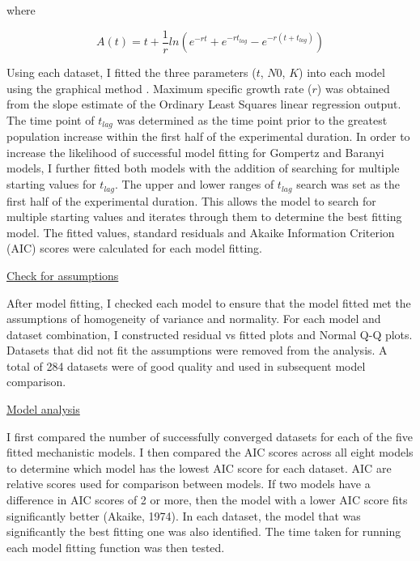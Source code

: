 \documentclass[11pt]{article}
\begin{document}
\begin{center} where \end{center} \begin{equation}  A(t) = t + \frac{1}{r}ln(e^{-rt}+e^{-rt_{lag}}- e^{-r(t+t_{lag})}) \end{equation}



Using each dataset, I fitted the three parameters (\(t\), \(N0\), \(K\)) into each model using the graphical method \cite{holmstrom_review_2002}. Maximum specific growth rate (\(r\)) was obtained from the slope estimate of the Ordinary Least Squares linear regression output. The time point of \(t_{lag}\) was determined as the time point prior to the greatest population increase within the first half of the experimental duration. In order to increase the likelihood of successful model fitting for Gompertz and Baranyi models, I further fitted both models with the addition of searching for multiple starting values for \(t_{lag}\). The upper and lower ranges of \(t_{lag}\) search was set as the first half of the experimental duration. This allows the model to search for multiple starting values and iterates through them to determine the best fitting model. The fitted values, standard residuals and Akaike Information Criterion (AIC) scores were calculated for each model fitting.
\vspace{\baselineskip}

\underline{Check for assumptions} 

After model fitting, I checked each model to ensure that the model fitted met the assumptions of homogeneity of variance and normality. For each model and dataset combination, I constructed residual vs fitted plots and Normal Q-Q plots. Datasets that did not fit the assumptions were removed from the analysis. A total of 284 datasets were of good quality and used in subsequent model comparison.
\vspace{\baselineskip}

\underline{Model analysis}

I first compared the number of successfully converged datasets for each of the five fitted mechanistic models. I then compared the AIC scores across all eight models to determine which model has the lowest AIC score for each dataset. AIC are relative scores used for comparison between models. If two models have a difference in AIC scores of 2 or more, then the model with a lower AIC score fits significantly better (Akaike, 1974). In each dataset, the model that was significantly the best fitting one was also identified. The time taken for running each model fitting function was then tested. 
\vspace{\baselineskip}
\end{document}
